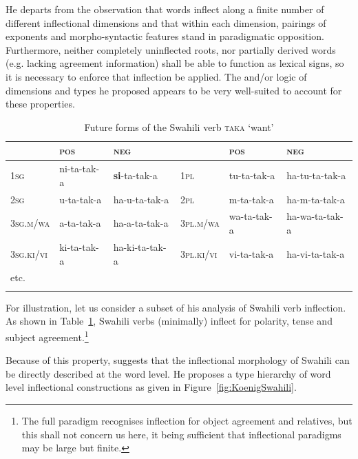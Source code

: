 \documentclass[output=paper
                ,modfonts
                ,nonflat
	        ,collection
	        ,collectionchapter
	        ,collectiontoclongg
 	        ,biblatex
                ,babelshorthands
                ,newtxmath
                ,draftmode
                ,colorlinks, citecolor=brown
]{./langsci/langscibook}
\begin{document}
{He departs from the observation that words  inflect along a finite number
of different inflectional dimensions and that within each dimension,
pairings of exponents and morpho-syntactic features stand in
paradigmatic opposition. Furthermore, neither completely uninflected
roots, nor partially derived words (e.g. lacking agreement
information) shall be able to function as lexical signs, so it is
necessary to enforce that inflection be applied. The and/or
logic of dimensions and types he proposed appears to be very
well-suited to account for these properties. 

\begin{table}
\setlength{\tabcolsep}{.3em}
\centering
\begin{tabular}{llllll}
\lsptoprule 
 & \textsc{pos} & \textsc{neg}     &             & \textsc{pos} & \textsc{neg}\\
\midrule 
\textsc{1sg} & ni-{ta}-tak-{a} & \textbf{{si}}-{ta}-tak-{a}        & \textsc{1pl} & tu-{ta}-tak-{a}     & {ha}-tu-{ta}-tak-{a}\\
\textsc{2sg} & u-{ta}-tak-{a} & {ha}-u-{ta}-tak-{a}        & \textsc{2pl} & m-{ta}-tak-{a}      & {ha}-m-{ta}-tak-{a}\\
\textsc{3sg.m/wa} & a-{ta}-tak-{a} & {ha}-a-{ta}-tak-{a}    & \textsc{3pl.m/wa} & wa-{ta}-tak-{a} & {ha}-wa-{ta}-tak-{a}\\ 
\textsc{3sg.ki/vi} & ki-{ta}-tak-{a} & {ha}-ki-{ta}-tak-{a} & \textsc{3pl.ki/vi} & vi-{ta}-tak-{a} & {ha}-vi-{ta}-tak-{a}\\
etc. & &\\
\lspbottomrule
\end{tabular}
\caption{Future forms of the Swahili verb  \textsc{taka} ‘want’}
\label{tab:SwahiliPast}
\end{table}


For illustration, let us consider a subset of his analysis of Swahili
verb inflection. As shown in Table~\ref{tab:SwahiliPast}, Swahili
verbs (minimally) inflect for polarity, tense and subject
agreement.\footnote{The full paradigm recognises inflection for object
agreement and relatives, but this shall not concern us here, it being
sufficient that inflectional paradigms may be large but finite.} 

Because of this property, \citet{Koenig99} suggests that the
inflectional morphology of Swahili can be directly described at the
word level. He proposes a type hierarchy of word level inflectional
constructions as given in Figure~\ref{fig:KoenigSwahili}. 

}
\end{document}
